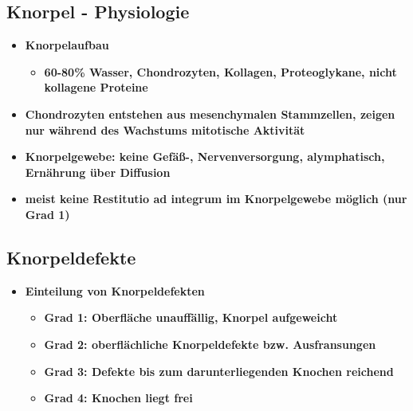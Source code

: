 \subsection{Knorpel - Physiologie}
	\begin{itemize}
		\item \textbf{Knorpelaufbau}
			\begin{itemize}
				\item \textbf{60-80\% Wasser, Chondrozyten, Kollagen, Proteoglykane, nicht kollagene Proteine}
			\end{itemize}
		\item \textbf{Chondrozyten entstehen aus mesenchymalen Stammzellen, zeigen nur während des Wachstums mitotische Aktivität}
		\item \textbf{Knorpelgewebe: keine Gefäß-, Nervenversorgung, alymphatisch, Ernährung über Diffusion}
		\item \textbf{meist keine Restitutio ad integrum im Knorpelgewebe möglich (nur Grad 1)}
 	\end{itemize}

\subsection{Knorpeldefekte}
	\begin{itemize}
		\item \textbf{Einteilung von Knorpeldefekten}
			\begin{itemize}
				\item \textbf{Grad 1: Oberfläche unauffällig, Knorpel aufgeweicht}
				\item \textbf{Grad 2: oberflächliche Knorpeldefekte bzw. Ausfransungen}
				\item \textbf{Grad 3: Defekte bis zum darunterliegenden Knochen reichend}
				\item \textbf{Grad 4: Knochen liegt frei}
			\end{itemize}
  	\end{itemize}

